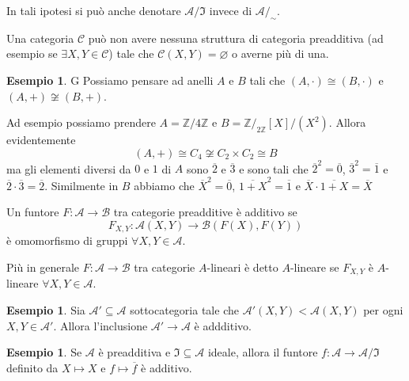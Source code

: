 \documentclass[notitlepage]{report}
\newcounter{theo}[section]\setcounter{theo}{0}
\newcounter{excounter}[section]\setcounter{excounter}{0}
\numberwithin{equation}{section}
\theoremstyle{plain}
\theoremstyle{definition}
\newtheorem{example}[excounter]{Esempio}
\theoremstyle{remark}
\begin{document}
In tali ipotesi si può anche denotare \(\mathcal{A} / \mathfrak{I}\) invece di
\(\mathcal{A}/_\sim\).

Una categoria \(\mathcal{C}\) può non avere nessuna struttura di categoria
    preadditiva (ad esempio se \(\exists X, Y \in \mathcal{C}\)) tale che \(\mathcal{C}{(X, Y)} = \varnothing\) o averne più di una.

\begin{example}{G}
    Possiamo pensare ad anelli \(A\) e \(B\) tali che \({(A, \cdot )} \cong {(B, \cdot )}\) e \({(A, +)} \not\cong {(B, +)}\).

    Ad esempio possiamo prendere \(A = \mathbb{Z} / 4 \mathbb{Z}\) e \(B = \mathbb{Z} /_{2 \mathbb{Z}} [X] / {(X^2)}\). Allora evidentemente 
    \[
      {(A, +)} \cong C_4 \not\cong C_{2} \times C_{2} \cong B
    \]
    ma gli elementi diversi da \(0\) e \(1\) di \(A\) sono \(\overline{2}\) e \(\overline{3}\) e sono tali che \(\overline{2}^2 = \overline{0}\), \(\overline{3}^2 = \overline{1}\) e \(\overline{2} \cdot \overline{3} = \overline{2}\). Similmente in \(B\) abbiamo che
    \(
      \overline{X}^2 = \overline{0}
    \), \(\overline{1+X}^2 = \overline{1}\) e \(\overline{X} \cdot \overline{1+X} = \overline{X}\)
\end{example}

\begin{definition}{}
    Un funtore \(F : \mathcal{A} \to \mathcal{B}\) tra categorie preadditive è
    additivo se 
    \[
      F_{X,Y}  : \mathcal{A}{(X, Y)} \to \mathcal{B}{(F{(X)}, F{(Y)})}
    \]
    è omomorfismo di gruppi \(\forall X, Y \in \mathcal{A}\).

    Più in generale \(F: \mathcal{A} \to \mathcal{B}\) tra categorie
    \(A\)-lineari è detto \(A\)-lineare se \(F_{X, Y} \) è \(A\)-lineare \(\forall X, Y \in \mathcal{A}\).
\end{definition}

\begin{example}{}
    Sia \(\mathcal{A}' \subseteq \mathcal{A} \) sottocategoria tale che \(\mathcal{A}'{(X, Y)} < \mathcal{A}{(X,Y)}\) per ogni \(X,Y \in \mathcal{A}'\). Allora l'inclusione \(\mathcal{A}' \to \mathcal{A}\) è addditivo.
\end{example}

\begin{example}{}
    Se \(\mathcal{A}\) è preadditiva e \(\mathfrak{I} \subseteq \mathcal{A} \)
    ideale, allora il funtore \(f : \mathcal{A} \to \mathcal{A}/\mathfrak{I}\) 
    definito da \(X \mapsto X\) e \(f \mapsto \overline{f}\) è additivo.
\end{example}
\end{document}
